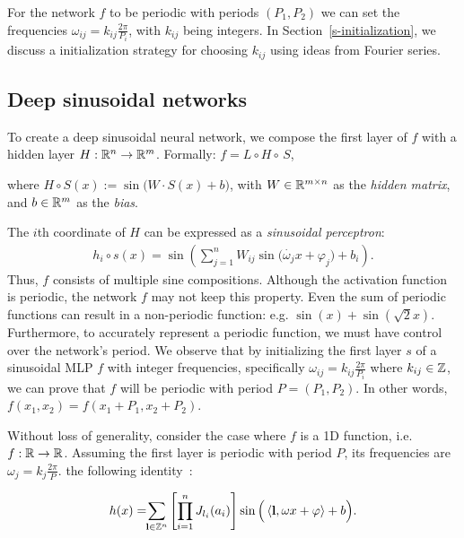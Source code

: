 For the network $f$ to be periodic with periods $(P_1,P_2)$ we can set the frequencies $\omega_{ij}=k_{ij}\frac{2\pi}{P_i}$, with $k_{ij}$ being integers. In Section~\ref{s-initialization}, we discuss a initialization strategy for choosing $k_{ij}$ using ideas from Fourier series.

\subsection{Deep sinusoidal networks}\label{s-deep-networks}

To create a deep sinusoidal neural network, we compose the first layer of $f$ with a hidden layer $H:\mathbb{R}^{n}\to \mathbb{R}^{m}$. Formally:
$f=L\circ H \circ \,S$, 

where $H\circ S(x):=\sin\big(W \cdot S(x)+b\big)$, with $W\in\mathbb{R}^{m\times n}$ as the \textit{hidden matrix}, and $b\in\mathbb{R}^{m}$ as the \textit{bias}.


The $i$th coordinate of $H$ can be expressed as a \textit{sinusoidal perceptron}:
%
\begin{align}
h_{i}\circ s(x)=\sin\left(\sum_{j=1}^{n} W_{ij} \sin\Big(\dot{\omega_j}{x}+\varphi_j\Big) + b_{i}\right).
\end{align}
%
Thus, $f$ consists of multiple sine compositions. Although  the activation function is periodic, the network $f$ may not keep this property. Even the sum of periodic functions can result in a non-periodic function: e.g. $\sin(x)+\sin\left(\sqrt{2}x\right)$. Furthermore, to accurately represent a periodic function, we must have control over the network's period.
We observe that by initializing the first layer $s$ of a sinusoidal MLP $f$ with integer frequencies, specifically $\omega_{ij}=k_{ij}\frac{2\pi}{P_i}$ where $k_{ij}\in\mathbb{Z}$, we can prove that $f$ will be periodic with period $P=(P_1,P_{2})$.
In other words, $f(x_1, x_2)=f(x_1+P_1, x_2+P_2)$.

Without loss of generality, consider the case where $f$ is a 1D function, i.e. $f:\mathbb{R}\to\mathbb{R}$.%
Assuming the first layer is periodic with period \( P \), its frequencies are \( \omega_j = k_j \frac{2\pi}{P} \).
 the following identity~\cite{novello2022understanding}:


\begin{align}\label{e-expansion}
    h(x)= \!\!\sum_{\textbf{l}\in\mathbb{Z}^n}\left[\prod_{i=1}^n J_{l_i}(a_i)\right]\sin\Big(\left\langle\textbf{l},\omega x +\varphi\right\rangle+ b\Big).
\end{align}

